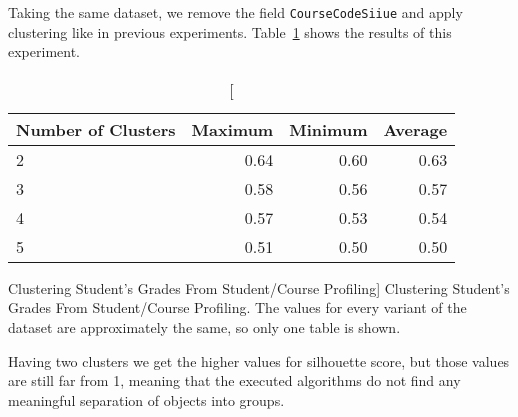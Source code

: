 Taking the same dataset, we remove the field \texttt{CourseCodeSiiue} and apply
clustering like in previous experiments. Table~\ref{tab:exp_006_res} shows the
results of this experiment.

\begin{table}[h!]
    \centering

    \begin{tabular}{| l | r | r | r |}
        \hline
        \textbf{Number of Clusters} & \textbf{Maximum} & \textbf{Minimum} & \textbf{Average} \\ \hline
        2 & 0.64 & 0.60 & 0.63 \\ \hline
        3 & 0.58 & 0.56 & 0.57 \\ \hline
        4 & 0.57 & 0.53 & 0.54 \\ \hline
        5 & 0.51 & 0.50 & 0.50 \\ \hline
    \end{tabular}

    \caption
        [Clustering Student's Grades From Student/Course Profiling]
        {Clustering Student's Grades From Student/Course Profiling. The values
        for every variant of the dataset are approximately the same, so only
        one table is shown.}

    \label{tab:exp_006_res}
\end{table}

Having two clusters we get the higher values for silhouette score, but those
values are still far from 1, meaning that the executed algorithms do not find
any meaningful separation of objects into groups.
